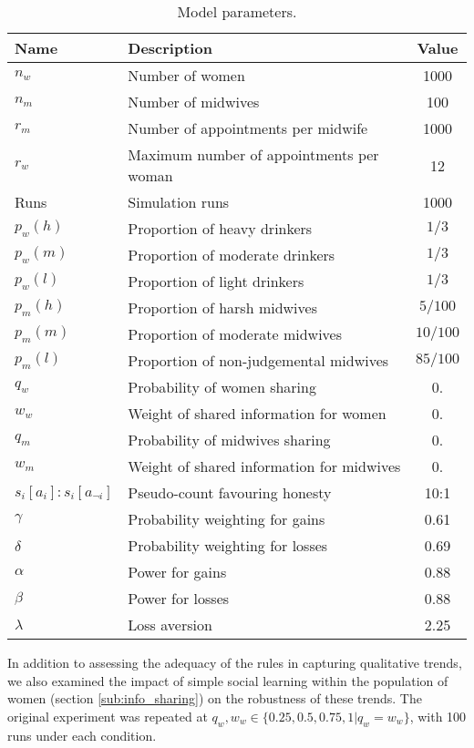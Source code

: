 \begin{table}[h!]
\caption{Model parameters.} 
\label{tab:qt_params}
\begin{tabular} {llc}
\hline
Name & Description & Value \\ \hline
\(n_{w}\) & Number of women & 1000 \\ \hline
\(n_{m}\) & Number of midwives & 100 \\ \hline
\(r_{m}\) & Number of appointments per midwife & 1000 \\ \hline
\(r_{w}\) & Maximum number of appointments per woman & 12 \\ \hline
Runs & Simulation runs & 1000 \\ \hline
\(p_{w}(h)\) & Proportion of heavy drinkers & \(1/3\) \\ \hline
\(p_{w}(m)\) & Proportion of moderate drinkers & \(1/3\) \\ \hline
\(p_{w}(l)\) & Proportion of light drinkers & \(1/3\) \\ \hline
\(p_{m}(h)\) & Proportion of harsh midwives & \(5/100\) \\ \hline
\(p_{m}(m)\) & Proportion of moderate midwives & \(10/100\) \\ \hline
\(p_{m}(l)\) & Proportion of non-judgemental midwives & \(85/100\) \\ \hline
\(q_{w}\) & Probability of women sharing & 0. \\ \hline
\(w_{w}\) & Weight of shared information for women & 0. \\ \hline
\(q_{m}\) & Probability of midwives sharing & 0. \\ \hline
\(w_{m}\) & Weight of shared information for midwives & 0. \\ \hline
\(s_{i}[a_{i}]:s_{i}[a_{\neg i}]\) & Pseudo-count favouring honesty & 10:1 \\ \hline
\(\gamma\) & Probability weighting for gains  & 0.61 \\ \hline
\(\delta\) & Probability weighting for losses &  0.69\\ \hline
\(\alpha\) & Power for gains  & 0.88 \\ \hline
\(\beta\) & Power for losses & 0.88 \\ \hline
\(\lambda\) & Loss aversion &  2.25 \\ \hline
\end{tabular}
\end{table}


In addition to assessing the adequacy of the rules in capturing qualitative trends, we also examined the impact of simple social learning within the population of women (section \ref{sub:info_sharing}) on the robustness of these trends. The original experiment was repeated at \(q_{w},w_{w}\in \{0.25, 0.5, 0.75, 1 | q_{w}=w_{w}\}\), with 100 runs under each condition. 

